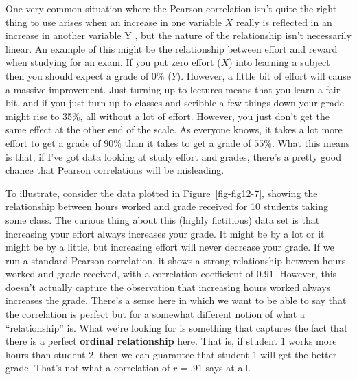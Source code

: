 \documentclass[
  a4paper,
]{book}
\begin{document}
One very common situation where the Pearson correlation isn't quite the
right thing to use arises when an increase in one variable \(X\) really
is reflected in an increase in another variable Y , but the nature of
the relationship isn't necessarily linear. An example of this might be
the relationship between effort and reward when studying for an exam. If
you put zero effort (\(X\)) into learning a subject then you should
expect a grade of \(0\%\) (\(Y\)). However, a little bit of effort will
cause a massive improvement. Just turning up to lectures means that you
learn a fair bit, and if you just turn up to classes and scribble a few
things down your grade might rise to 35\%, all without a lot of effort.
However, you just don't get the same effect at the other end of the
scale. As everyone knows, it takes a lot more effort to get a grade of
\(90\%\) than it takes to get a grade of \(55\%\). What this means is
that, if I've got data looking at study effort and grades, there's a
pretty good chance that Pearson correlations will be misleading.

To illustrate, consider the data plotted in Figure~\ref{fig-fig12-7},
showing the relationship between hours worked and grade received for 10
students taking some class. The curious thing about this (highly
fictitious) data set is that increasing your effort always increases
your grade. It might be by a lot or it might be by a little, but
increasing effort will never decrease your grade. If we run a standard
Pearson correlation, it shows a strong relationship between hours worked
and grade received, with a correlation coefficient of \(0.91\). However,
this doesn't actually capture the observation that increasing hours
worked always increases the grade. There's a sense here in which we want
to be able to say that the correlation is perfect but for a somewhat
different notion of what a ``relationship'' is. What we're looking for
is something that captures the fact that there is a perfect
\textbf{ordinal relationship} here. That is, if student 1 works more
hours than student 2, then we can guarantee that student 1 will get the
better grade. That's not what a correlation of \(r = .91\) says at all.
\end{document}
